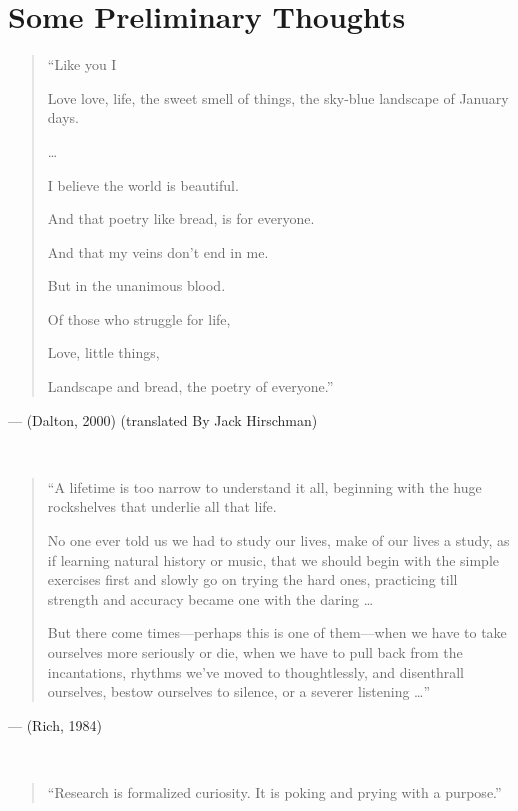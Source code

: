 \documentclass[
  letterpaper,
  DIV=11,
  numbers=noendperiod]{scrreprt}
\begin{document}

\chapter*{Some Preliminary Thoughts}\label{some-preliminary-thoughts}


\begin{quote}
``Like you I

Love love, life, the sweet smell of things, the sky-blue landscape of
January days.

\ldots{}

I believe the world is beautiful.

And that poetry like bread, is for everyone.

And that my veins don't end in me.

But in the unanimous blood.

Of those who struggle for life,

Love, little things,

Landscape and bread, the poetry of everyone.''
\end{quote}

--- (Dalton, 2000) (translated By Jack Hirschman) 

\(~\)

\begin{quote}
``A lifetime is too narrow to understand it all, beginning with the huge
rockshelves that underlie all that life.

No one ever told us we had to study our lives, make of our lives a
study, as if learning natural history or music, that we should begin
with the simple exercises first and slowly go on trying the hard ones,
practicing till strength and accuracy became one with the daring
\ldots{}

But there come times---perhaps this is one of them---when we have to
take ourselves more seriously or die, when we have to pull back from the
incantations, rhythms we've moved to thoughtlessly, and disenthrall
ourselves, bestow ourselves to silence, or a severer listening \ldots''
\end{quote}

--- (Rich, 1984)

\(~\)

\begin{quote}
``Research is formalized curiosity. It is poking and prying with a
purpose.''
\end{quote}
\end{document}
